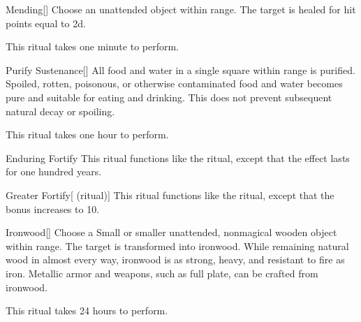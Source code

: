 \lowercase{\hypertarget{spell:Mending}{}}\label{spell:Mending}
\begin{apability}[\nth{1}]{\hypertarget{spell:Mending}{Mending}}[]
Choose an unattended object within \rngclose range.
The target is healed for hit points equal to  \plus2d.

This ritual takes one minute to perform.
\end{apability}
\vspace{0.25em}



\lowercase{\hypertarget{spell:Purify Sustenance}{}}\label{spell:Purify Sustenance}
\begin{apability}[\nth{1}]{\hypertarget{spell:Purify Sustenance}{Purify Sustenance}}[]
All food and water in a single square within \rngclose range is purified.
Spoiled, rotten, poisonous, or otherwise contaminated food and water becomes pure and suitable for eating and drinking.
This does not prevent subsequent natural decay or spoiling.

This ritual takes one hour to perform.
\end{apability}
\vspace{0.25em}



\lowercase{\hypertarget{spell:Enduring Fortify}{}}\label{spell:Enduring Fortify}
\begin{apability}[\nth{3}]{\hypertarget{spell:Enduring Fortify}{Enduring Fortify}}
This ritual functions like the  ritual, except that the effect lasts for one hundred years.
\end{apability}
\vspace{0.25em}



\lowercase{\hypertarget{spell:Greater Fortify}{}}\label{spell:Greater Fortify}
\begin{attuneability}[\nth{3}]{\hypertarget{spell:Greater Fortify}{Greater Fortify}}[ (ritual)]
This ritual functions like the  ritual, except that the  bonus increases to 10.
\end{attuneability}
\vspace{0.25em}



\lowercase{\hypertarget{spell:Ironwood}{}}\label{spell:Ironwood}
\begin{apability}[\nth{3}]{\hypertarget{spell:Ironwood}{Ironwood}}[]
Choose a Small or smaller unattended, nonmagical wooden object within \rngclose range.
The target is transformed into ironwood.
While remaining natural wood in almost every way, ironwood is as strong, heavy, and resistant to fire as iron.
Metallic armor and weapons, such as full plate, can be crafted from ironwood.

This ritual takes 24 hours to perform.
\end{apability}
\vspace{0.25em}



